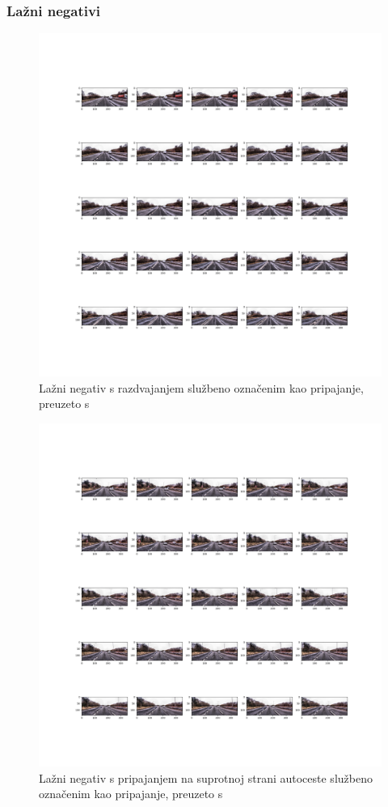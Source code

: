 \documentclass[times, utf8, diplomski, numeric]{fer}
\begin{document}
\subsubsection{Lažni negativi }
\begin{figure}[H]
\centering
\includegraphics[scale=0.3]{images/fn_1.png}
\caption{Lažni negativ s razdvajanjem službeno označenim kao pripajanje, preuzeto s \citep{url:ftts_irap}}
\label{img:fn_1}
\end{figure}

\begin{figure}[H]
\centering
\includegraphics[scale=0.3]{images/fn_2.png}
\caption{Lažni negativ s pripajanjem na suprotnoj strani autoceste službeno označenim kao pripajanje, preuzeto s \citep{url:ftts_irap}}
\label{img:fn_2}
\end{figure}
\end{document}
